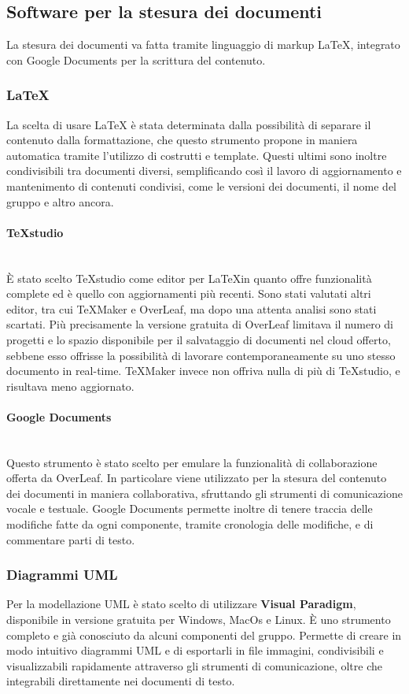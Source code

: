\subsection{Software per la stesura dei documenti}
La stesura dei documenti va fatta tramite linguaggio di markup LaTeX, integrato con Google Documents per la scrittura del contenuto. 

\subsubsection{\LaTeX}
La scelta di usare \LaTeX{} è stata determinata dalla possibilità di separare il contenuto dalla formattazione, che questo strumento propone in maniera automatica tramite l'utilizzo di costrutti e template. Questi ultimi sono inoltre condivisibili tra documenti diversi, semplificando così il lavoro di aggiornamento e mantenimento di contenuti condivisi, come le versioni dei documenti, il nome del gruppo e altro ancora.

\paragraph{TeXstudio}\mbox{}\\
È stato scelto TeXstudio come editor per \LaTeX in quanto offre funzionalità complete ed è quello con aggiornamenti più recenti. Sono stati valutati altri editor, tra cui TeXMaker e OverLeaf, ma dopo una attenta analisi sono stati scartati. Più precisamente la versione gratuita di OverLeaf limitava il numero di progetti e lo spazio disponibile per il salvataggio di documenti nel cloud offerto, sebbene esso offrisse la possibilità di lavorare contemporaneamente su uno stesso documento in real-time. TeXMaker invece non offriva nulla di più di TeXstudio, e risultava meno aggiornato.

\paragraph{Google Documents}\mbox{}\\
Questo strumento è stato scelto per emulare la funzionalità di collaborazione offerta da OverLeaf. In particolare viene utilizzato per la stesura del contenuto dei documenti in maniera collaborativa, sfruttando gli strumenti di comunicazione vocale e testuale. Google Documents permette inoltre di tenere traccia delle modifiche fatte da ogni componente, tramite cronologia delle modifiche, e di commentare parti di testo. 

\subsubsection{Diagrammi UML}
Per la modellazione UML è stato scelto di utilizzare \textbf{Visual Paradigm}, disponibile in versione gratuita per Windows, MacOs e Linux. È uno strumento completo e già conosciuto da alcuni componenti del gruppo. Permette di creare in modo intuitivo diagrammi UML e di esportarli in file immagini, condivisibili e visualizzabili rapidamente attraverso gli strumenti di comunicazione, oltre che integrabili direttamente nei documenti di testo.

